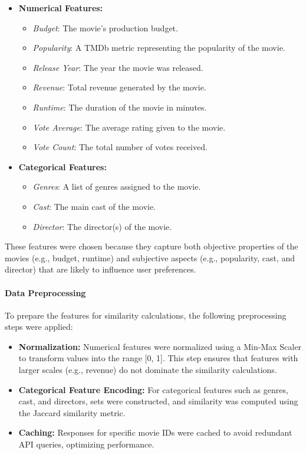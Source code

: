 \documentclass[a4paper,10pt]{article}
\begin{document}
\begin{itemize}
    \item \textbf{Numerical Features:}
    \begin{itemize}
        \item \textit{Budget}: The movie's production budget.
        \item \textit{Popularity}: A TMDb metric representing the popularity of the movie.
        \item \textit{Release Year}: The year the movie was released.
        \item \textit{Revenue}: Total revenue generated by the movie.
        \item \textit{Runtime}: The duration of the movie in minutes.
        \item \textit{Vote Average}: The average rating given to the movie.
        \item \textit{Vote Count}: The total number of votes received.
    \end{itemize}
    \item \textbf{Categorical Features:}
    \begin{itemize}
        \item \textit{Genres}: A list of genres assigned to the movie.
        \item \textit{Cast}: The main cast of the movie.
        \item \textit{Director}: The director(s) of the movie.
    \end{itemize}
\end{itemize}

These features were chosen because they capture both objective
properties of the movies (e.g., budget, runtime) and subjective
aspects (e.g., popularity, cast, and director) that are likely to
influence user preferences.

\paragraph{Data Preprocessing}
To prepare the features for similarity calculations, the following
preprocessing steps were applied:

\begin{itemize}
    \item \textbf{Normalization:} Numerical features were normalized using a Min-Max Scaler to transform values into the range [0, 1]. This step ensures that features with larger scales (e.g., revenue) do not dominate the similarity calculations.
    \item \textbf{Categorical Feature Encoding:} For categorical features such as genres, cast, and directors, sets were constructed, and similarity was computed using the Jaccard similarity metric.
    \item \textbf{Caching:} Responses for specific movie IDs were cached to avoid redundant API queries, optimizing performance.
\end{itemize}
\end{document}
